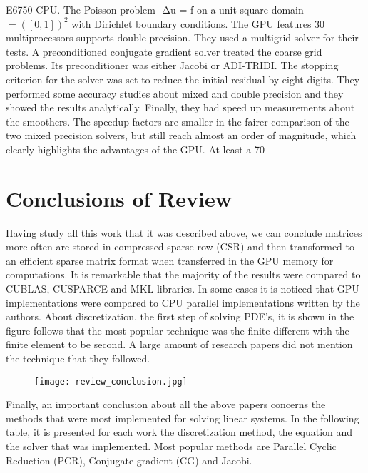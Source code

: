 E6750 CPU. The Poisson problem -Δu = f on a unit square domain  $= ([0,1])^2$ with Dirichlet boundary conditions. The GPU features 30 multiprocessors supports double precision. They used a multigrid solver for their tests. A preconditioned conjugate gradient solver treated the coarse grid problems. Its preconditioner was either Jacobi or ADI-TRIDI. The stopping criterion for the solver was set to reduce the initial residual by eight digits. They performed some accuracy studies about mixed and double precision and they showed the results analytically. Finally, they had speed up measurements about the smoothers. The speedup factors are smaller in the fairer comparison of the two mixed precision solvers, but still reach almost an order of magnitude, which clearly highlights the advantages of the GPU. At least a 70%




\section{Conclusions of Review}

Having study all this work that it was described above, we can conclude matrices more often are stored in compressed sparse row (CSR) and then transformed to an efficient sparse matrix format when transferred in the GPU memory for computations.
It is remarkable that the majority of the results were compared to CUBLAS, CUSPARCE and MKL libraries. In some cases it is noticed that GPU implementations were compared to CPU parallel implementations written by the authors.
About discretization, the first step of solving PDE’s, it is shown in the figure follows that the most popular technique was the finite different with the finite element to be second. A large amount of research papers did not mention the technique that they followed.

 \begin{figure}[H]
    \centering
        \texttt{[image: review\_conclusion.jpg]}
    \caption{}
    \label{fig:warp_scheduler}
\end{figure}

Finally, an important conclusion about all the above papers concerns the methods that were most implemented for solving linear systems. In the following table, it is presented for each work the discretization method, the equation and the solver that was implemented. Most popular methods are Parallel Cyclic Reduction (PCR), Conjugate gradient (CG) and Jacobi. 

